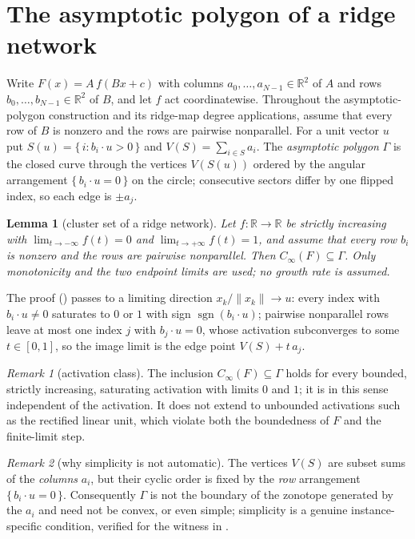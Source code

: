 \documentclass[11pt,twoside,leqno]{article}
\theoremstyle{plain}
\newtheorem{lemma}[lemma]{Lemma}
\theoremstyle{definition}
\theoremstyle{remark}
\newtheorem{remark}[remark]{Remark}
\newcommand{\R}{\mathbb{R}}
\newcommand{\sgn}{\operatorname{sgn}}
\newcommand{\norm}[1]{\lVert #1 \rVert}
\newcommand{\clinf}{C_{\infty}}
\begin{document}
\section{The asymptotic polygon of a ridge network}\label{sec:lemma}

Write $F(x)=A\,f(Bx+c)$ with columns $a_0,\dots,a_{N-1}\in\R^2$ of $A$ and rows $b_0,\dots,b_{N-1}\in\R^2$ of $B$, and let $f$ act coordinatewise. Throughout the asymptotic-polygon construction and its ridge-map degree applications, assume that every row of $B$ is nonzero and the rows are pairwise nonparallel. For a unit vector $u$ put $S(u)=\{\,i: b_i\cdot u>0\,\}$ and $V(S)=\sum_{i\in S}a_i$. The \emph{asymptotic polygon} $\Gamma$ is the closed curve through the vertices $V(S(u))$ ordered by the angular arrangement $\{\,b_i\cdot u=0\,\}$ on the circle; consecutive sectors differ by one flipped index, so each edge is $\pm a_j$.

\begin{lemma}[cluster set of a ridge network]\label{lem:polygon}
Let $f:\R\to\R$ be strictly increasing with $\lim_{t\to-\infty}f(t)=0$ and $\lim_{t\to+\infty}f(t)=1$, and assume that every row $b_i$ is nonzero and the rows are pairwise nonparallel. Then $\clinf(F)\subseteq\Gamma$. Only monotonicity and the two endpoint limits are used; no growth rate is assumed.
\end{lemma}

The proof () passes to a limiting direction $x_k/\norm{x_k}\to u$: every index with $b_i\cdot u\neq 0$ saturates to $0$ or $1$ with sign $\sgn(b_i\cdot u)$; pairwise nonparallel rows leave at most one index $j$ with $b_j\cdot u=0$, whose activation subconverges to some $t\in[0,1]$, so the image limit is the edge point $V(S)+t\,a_j$.

\begin{remark}[activation class]\label{rmk:activation}
The inclusion $\clinf(F)\subseteq\Gamma$ holds for every bounded, strictly increasing, saturating activation with limits $0$ and $1$; it is in this sense independent of the activation. It does not extend to unbounded activations such as the rectified linear unit, which violate both the boundedness of $F$ and the finite-limit step.
\end{remark}

\begin{remark}[why simplicity is not automatic]\label{rmk:notzonotope}
The vertices $V(S)$ are subset sums of the \emph{columns} $a_i$, but their cyclic order is fixed by the \emph{row} arrangement $\{\,b_i\cdot u=0\,\}$. Consequently $\Gamma$ is not the boundary of the zonotope generated by the $a_i$ and need not be convex, or even simple; simplicity is a genuine instance-specific condition, verified for the witness in .
\end{remark}
\end{document}
